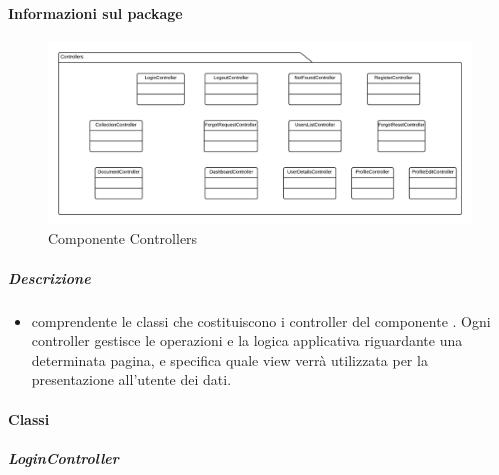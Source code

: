 	\paragraph{Informazioni sul package} 
		\begin{figure}[H] 
			\begin{center} 
				\includegraphics[width=\textwidth]{uml/package/Front-end::Controllers.png}  
				\caption{Componente Controllers}
			\end{center}  
		\end{figure} 
	\subparagraph{Descrizione} 
		\begin{itemize}
		\item[]  comprendente le classi che costituiscono i controller del componente . Ogni controller gestisce le operazioni e la logica applicativa riguardante una determinata pagina, e specifica quale view verrà utilizzata per la presentazione all'utente dei dati.
		\end{itemize} 
		\paragraph{Classi}
			\subparagraph{LoginController}
				
